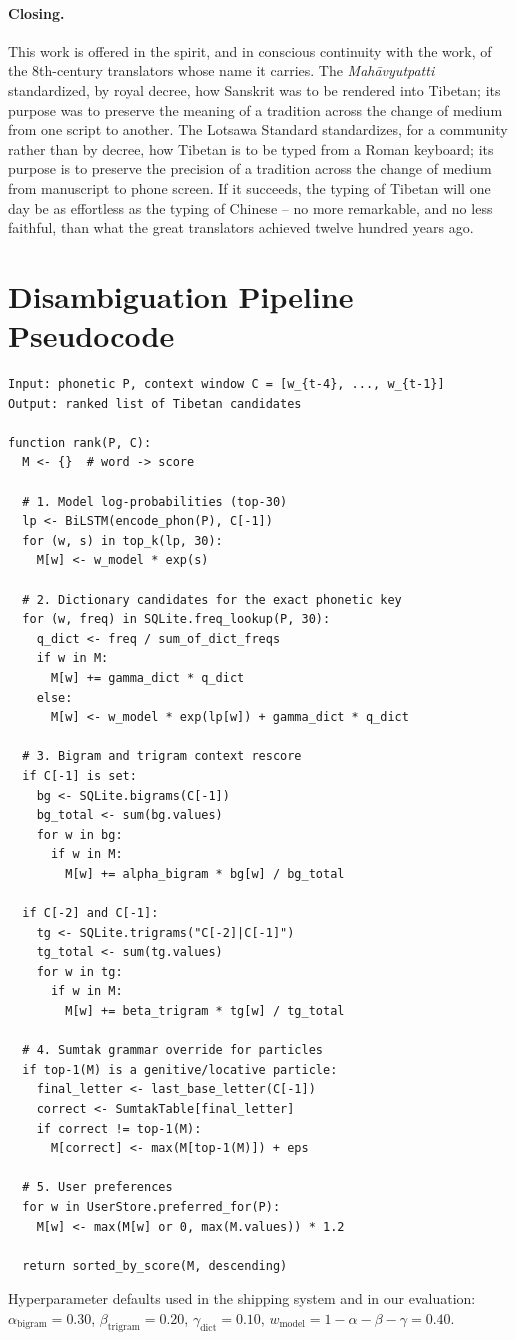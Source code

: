 \documentclass[11pt]{article}
\begin{document}
\paragraph{Closing.} This work is offered in the spirit, and in conscious continuity with the work, of the 8th-century translators whose name it carries. The \emph{Mahāvyutpatti} standardized, by royal decree, how Sanskrit was to be rendered into Tibetan; its purpose was to preserve the meaning of a tradition across the change of medium from one script to another. The Lotsawa Standard standardizes, for a community rather than by decree, how Tibetan is to be typed from a Roman keyboard; its purpose is to preserve the precision of a tradition across the change of medium from manuscript to phone screen. If it succeeds, the typing of Tibetan will one day be as effortless as the typing of Chinese -- no more remarkable, and no less faithful, than what the great translators achieved twelve hundred years ago.




\appendix

\section{Disambiguation Pipeline Pseudocode}
\label{app:pipeline}

\begin{verbatim}
Input: phonetic P, context window C = [w_{t-4}, ..., w_{t-1}]
Output: ranked list of Tibetan candidates

function rank(P, C):
  M <- {}  # word -> score

  # 1. Model log-probabilities (top-30)
  lp <- BiLSTM(encode_phon(P), C[-1])
  for (w, s) in top_k(lp, 30):
    M[w] <- w_model * exp(s)

  # 2. Dictionary candidates for the exact phonetic key
  for (w, freq) in SQLite.freq_lookup(P, 30):
    q_dict <- freq / sum_of_dict_freqs
    if w in M:
      M[w] += gamma_dict * q_dict
    else:
      M[w] <- w_model * exp(lp[w]) + gamma_dict * q_dict

  # 3. Bigram and trigram context rescore
  if C[-1] is set:
    bg <- SQLite.bigrams(C[-1])
    bg_total <- sum(bg.values)
    for w in bg:
      if w in M:
        M[w] += alpha_bigram * bg[w] / bg_total

  if C[-2] and C[-1]:
    tg <- SQLite.trigrams("C[-2]|C[-1]")
    tg_total <- sum(tg.values)
    for w in tg:
      if w in M:
        M[w] += beta_trigram * tg[w] / tg_total

  # 4. Sumtak grammar override for particles
  if top-1(M) is a genitive/locative particle:
    final_letter <- last_base_letter(C[-1])
    correct <- SumtakTable[final_letter]
    if correct != top-1(M):
      M[correct] <- max(M[top-1(M)]) + eps

  # 5. User preferences
  for w in UserStore.preferred_for(P):
    M[w] <- max(M[w] or 0, max(M.values)) * 1.2

  return sorted_by_score(M, descending)
\end{verbatim}

Hyperparameter defaults used in the shipping system and in our
evaluation:
$\alpha_{\text{bigram}}=0.30$,
$\beta_{\text{trigram}}=0.20$,
$\gamma_{\text{dict}}=0.10$,
$w_{\text{model}}=1-\alpha-\beta-\gamma=0.40$.
\end{document}
